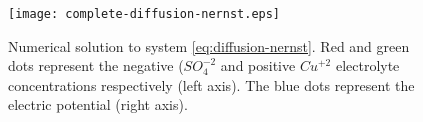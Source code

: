 \begin{figure}[htbp]
\centering
\texttt{[image: complete-diffusion-nernst.eps]}
\caption{Numerical solution to system \ref{eq:diffusion-nernst}. Red and green dots represent the negative ($SO_4^{-2}$ and positive $Cu^{+2}$ electrolyte concentrations respectively (left axis). The blue dots represent the electric potential (right axis).}
\label{fig:diffusion-comparison}
\end{figure}









